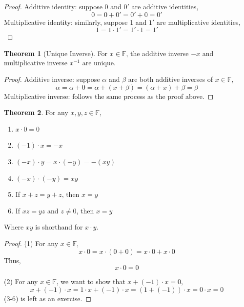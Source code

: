 \documentclass[12pt]{report}
\numberwithin{equation}{section}
\theoremstyle{definition}
\newtheorem{theorem}{Theorem}[section]
\begin{document}
	\begin{proof}
		Additive identity: suppose 0 and $ 0' $ are additive identities,
		\begin{equation}
				0 = 0 + 0' = 0' + 0 = 0'
		\end{equation}
		Multiplicative identity: similarly, suppose 1 and $ 1' $ are multiplicative identities,
		\begin{equation}
				1 = 1\cdot 1' = 1'\cdot 1 = 1'
		\end{equation}
	\end{proof}

	\begin{theorem}[Unique Inverse]
		For $ x\in \mathbb{F} $, the additive inverse $ -x $ and multiplicative inverse $ x^{-1} $ are unique.
	\end{theorem}
	\begin{proof}
		Additive inverse: suppose $ \alpha $ and $ \beta $ are both additive inverses of $ x\in \mathbb{F} $,
		\begin{equation}
				\alpha = \alpha + 0 = \alpha+(x + \beta) = (\alpha + x) + \beta = \beta
		\end{equation}
	Multiplicative inverse: follows the same process as the proof above.
	\end{proof}

\begin{theorem}
	For any $ x,y, z\in \mathbb{F} $, 
	\begin{enumerate}
		\item $ x\cdot 0  = 0$
		\item $ (-1)\cdot x  = -x$
		\item $ (-x)\cdot y = x\cdot(-y) = -(xy) $
		\item $ (-x)\cdot (-y) = xy $
		\item If $ x +z = y+z$, then $ x = y $
		\item If $ xz = yz $ and $ z\neq 0 $, then $ x=y $
	\end{enumerate}
	Where $ xy $ is shorthand for $ x\cdot y $. 
\end{theorem}

\begin{proof}
	(1) For any $ x\in \mathbb{F} $,
	\begin{equation}
			x\cdot 0 = x\cdot (0+0) = x\cdot 0 + x\cdot 0
	\end{equation}
	Thus,
	\begin{equation}
			x\cdot 0 = 0
	\end{equation}

	(2) For any $ x\in \mathbb{F} $, we want to show that $ x + (-1)\cdot x = 0 $,
	\begin{equation}
			x + (-1)\cdot x = 1\cdot x + (-1)\cdot x = (1+(-1))\cdot x = 0\cdot x = 0 
	\end{equation}
	(3-6) is left as an exercise.
\end{proof}
\end{document}
